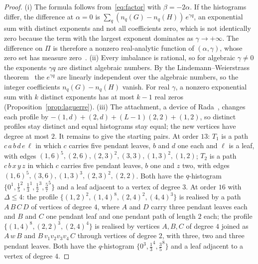   \begin{proof}
  (i) The formula follows from~\eqref{eq:factor} with $\beta = -2\alpha$.
  If the histograms differ, the difference at $\alpha = 0$ is
  $\sum_q (n_q(G) - n_q(H))\,e^{\gamma q}$, an exponential sum with
  distinct exponents and not all coefficients zero, which is not
  identically zero because the term with the largest exponent dominates
  as $\gamma \to +\infty$. The difference on $\Pi$ is therefore a nonzero
  real-analytic function of $(\alpha,\gamma)$, whose zero set has
  measure zero~\cite{Mityagin2020}.
  (ii) Every imbalance is rational, so for algebraic $\gamma \neq 0$ the
  exponents $\gamma q$ are distinct algebraic numbers. By the
  Lindemann--Weierstrass theorem~\cite{Baker1975} the $e^{\gamma q}$ are
  linearly independent over the algebraic numbers, so the integer
  coefficients $n_q(G) - n_q(H)$ vanish. For real $\gamma$, a nonzero
  exponential sum with $k$ distinct exponents has at most $k - 1$ real
  zeros (Proposition~\ref{prop:laguerre}).
  (iii) The attachment, a device of Rada~\cite{Rada2026LinearVDB},
  changes each profile by $-(1,d) + (2,d) + (L-1)(2,2) + (1,2)$, so
  distinct profiles stay distinct and equal histograms stay equal; the
  new vertices have degree at most $2$. It remains to give the starting
  pairs. At order $13$: $T_1$ is a path $c\,a\,b\,d\,e\,\ell$ in which $c$
  carries five pendant leaves, $b$ and $d$ one each and $\ell$ is a leaf,
  with edges $(1,6)^{5}, (2,6), (2,3)^{2}, (3,3), (1,3)^{2}, (1,2)$;
  $T_2$ is a path $c\,b\,x\,y\,z$ in which $c$ carries five pendant
  leaves, $b$ one and $z$ two, with edges
  $(1,6)^{5}, (3,6), (1,3)^{3}, (2,3)^{2}, (2,2)$. Both have the
  $q$-histogram $\{0^{1}, \tfrac15^{2}, \tfrac13^{1}, \tfrac12^{3}, \tfrac57^{5}\}$
  and a leaf adjacent to a vertex of degree $3$. At order $16$ with
  $\Delta \le 4$: the profile
  $\{(1,2)^{2}, (1,4)^{8}, (2,4)^{2}, (4,4)^{3}\}$ is realised by a path
  $A\,B\,C\,D$ of vertices of degree $4$, where $A$ and $D$ carry three
  pendant leaves each and $B$ and $C$ one pendant leaf and one pendant
  path of length $2$ each; the profile
  $\{(1,4)^{8}, (2,2)^{3}, (2,4)^{4}\}$ is realised by vertices $A, B, C$
  of degree $4$ joined as $A\,w\,B$ and $B\,v_1 v_2 v_3 v_4\,C$ through
  vertices of degree $2$, with three, two and three pendant leaves. Both
  have the $q$-histogram $\{0^{3}, \tfrac13^{4}, \tfrac35^{8}\}$ and a
  leaf adjacent to a vertex of degree $4$.
  \end{proof}

